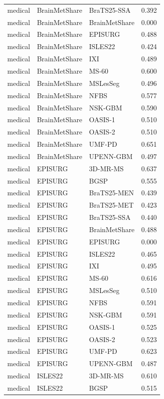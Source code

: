 \begin{tabular}{lllr}
medical & BrainMetShare & BraTS25-SSA & 0.392 \\
medical & BrainMetShare & BrainMetShare & 0.000 \\
medical & BrainMetShare & EPISURG & 0.488 \\
medical & BrainMetShare & ISLES22 & 0.424 \\
medical & BrainMetShare & IXI & 0.489 \\
medical & BrainMetShare & MS-60 & 0.600 \\
medical & BrainMetShare & MSLesSeg & 0.496 \\
medical & BrainMetShare & NFBS & 0.577 \\
medical & BrainMetShare & NSK-GBM & 0.590 \\
medical & BrainMetShare & OASIS-1 & 0.510 \\
medical & BrainMetShare & OASIS-2 & 0.510 \\
medical & BrainMetShare & UMF-PD & 0.651 \\
medical & BrainMetShare & UPENN-GBM & 0.497 \\
medical & EPISURG & 3D-MR-MS & 0.637 \\
medical & EPISURG & BGSP & 0.555 \\
medical & EPISURG & BraTS25-MEN & 0.439 \\
medical & EPISURG & BraTS25-MET & 0.423 \\
medical & EPISURG & BraTS25-SSA & 0.440 \\
medical & EPISURG & BrainMetShare & 0.488 \\
medical & EPISURG & EPISURG & 0.000 \\
medical & EPISURG & ISLES22 & 0.465 \\
medical & EPISURG & IXI & 0.495 \\
medical & EPISURG & MS-60 & 0.616 \\
medical & EPISURG & MSLesSeg & 0.510 \\
medical & EPISURG & NFBS & 0.591 \\
medical & EPISURG & NSK-GBM & 0.591 \\
medical & EPISURG & OASIS-1 & 0.525 \\
medical & EPISURG & OASIS-2 & 0.523 \\
medical & EPISURG & UMF-PD & 0.623 \\
medical & EPISURG & UPENN-GBM & 0.487 \\
medical & ISLES22 & 3D-MR-MS & 0.610 \\
medical & ISLES22 & BGSP & 0.515 \\

\end{tabular}
